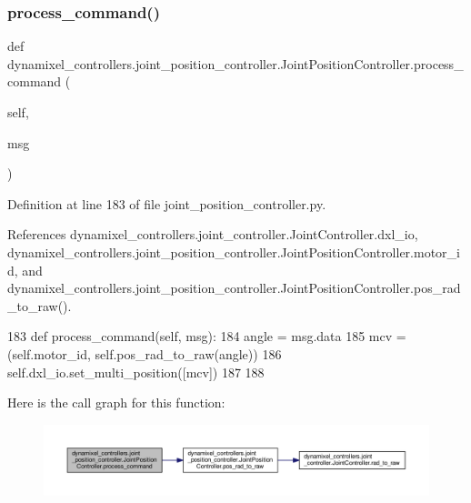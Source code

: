 \subsubsection{\texorpdfstring{process\+\_\+command()}{process\_command()}}
{\footnotesize\ttfamily def dynamixel\+\_\+controllers.\+joint\+\_\+position\+\_\+controller.\+Joint\+Position\+Controller.\+process\+\_\+command (\begin{DoxyParamCaption}\item[{}]{self,  }\item[{}]{msg }\end{DoxyParamCaption})}



Definition at line 183 of file joint\+\_\+position\+\_\+controller.\+py.



References dynamixel\+\_\+controllers.\+joint\+\_\+controller.\+Joint\+Controller.\+dxl\+\_\+io, dynamixel\+\_\+controllers.\+joint\+\_\+position\+\_\+controller.\+Joint\+Position\+Controller.\+motor\+\_\+id, and dynamixel\+\_\+controllers.\+joint\+\_\+position\+\_\+controller.\+Joint\+Position\+Controller.\+pos\+\_\+rad\+\_\+to\+\_\+raw().


\begin{DoxyCode}
183     \textcolor{keyword}{def }process\_command(self, msg):
184         angle = msg.data
185         mcv = (self.motor\_id, self.pos\_rad\_to\_raw(angle))
186         self.dxl\_io.set\_multi\_position([mcv])
187 
188 \end{DoxyCode}
Here is the call graph for this function\+:
\nopagebreak
\begin{figure}[H]
\begin{center}
\leavevmode
\includegraphics[width=350pt]{d1/df0/classdynamixel__controllers_1_1joint__position__controller_1_1_joint_position_controller_af81781a3d97047b957206165ad3d2fd3_cgraph}
\end{center}
\end{figure}
\mbox{\label{classdynamixel__controllers_1_1joint__position__controller_1_1_joint_position_controller_a3ef4e39b3b625fbdb5a9b418b97fcf05}} 
